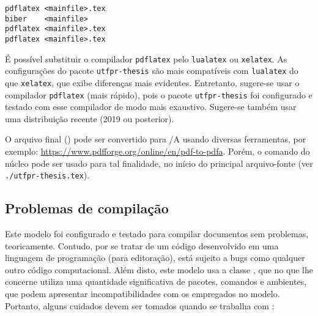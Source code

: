 \begin{snugshade}
\begin{Verbatim}
pdflatex <mainfile>.tex
biber    <mainfile>
pdflatex <mainfile>.tex
pdflatex <mainfile>.tex
\end{Verbatim}
\end{snugshade}

É possível substituir o compilador \texttt{pdflatex} pelo \texttt{lualatex} ou \texttt{xelatex}.
As configurações do pacote \texttt{utfpr-thesis} são mais compatíveis com \texttt{lualatex} do que \texttt{xelatex}, que exibe diferenças mais evidentes.
Entretanto, sugere-se usar o compilador \texttt{pdflatex} (mais rápido), pois o pacote \texttt{utfpr-thesis} foi configurado e testado com esse compilador de modo mais exaustivo.
Sugere-se também usar uma distribuição  recente (2019 ou posterior).

O arquivo final () pode ser convertido para /A usando diversas ferramentas, por exemplo: \url{https://www.pdfforge.org/online/en/pdf-to-pdfa}. Porém, o comando  do núcleo  pode ser usado para tal finalidade, no início do principal arquivo-fonte (ver \texttt{./utfpr-thesis.tex}).

\subsection{Problemas de compilação}%
\label{ssect:comp-prob}

Este modelo foi configurado e testado para compilar documentos sem problemas, teoricamente.
Contudo, por se tratar de um código desenvolvido em uma linguagem de programação (para editoração), está sujeito a bugs como qualquer outro código computacional.
Além disto, este modelo usa a classe \texttt{}, que no que lhe concerne utiliza uma quantidade significativa de pacotes, comandos e ambientes, que podem apresentar incompatibilidades com os empregados no modelo.
Portanto, alguns cuidados devem ser tomados quando se trabalha com :

